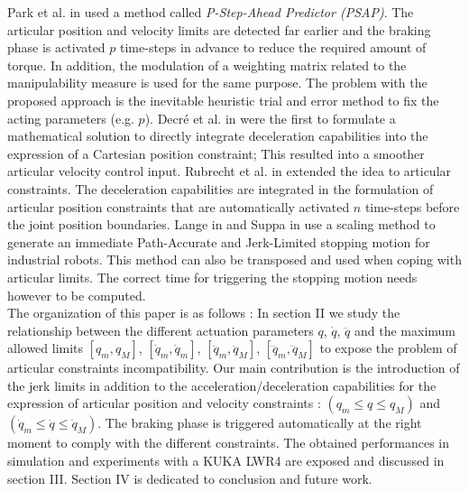 \documentclass[a4paper, 10pt, conference]{ieeeconf}      %
\begin{document}
Park et al. in \cite{park1998enhanced} used a method called \textit{P-Step-Ahead Predictor (PSAP)}. The articular position and velocity limits are  detected far earlier and the braking phase is activated $p$ time-steps in advance to reduce the required amount of torque. In addition, the modulation of a weighting matrix related to the manipulability measure \cite{yoshikawa1985manipulability} is used for the same purpose. The problem with the proposed approach is the inevitable heuristic trial and error method to fix the acting parameters (e.g. $p$). Decré et al. in \cite{decre2009extending} were the first to  formulate a mathematical solution to directly integrate deceleration capabilities into the expression of a Cartesian position constraint; This resulted into a smoother articular velocity control input. Rubrecht et al. in \cite{rubrecht2010constraints} extended the idea to articular constraints. The deceleration capabilities  are integrated in the formulation of articular position constraints that are automatically activated $n$ time-steps before the joint position boundaries. Lange in \cite{lange2014predictive} and Suppa in \cite{lange2015trajectory} use a scaling method to generate an immediate Path-Accurate and Jerk-Limited stopping motion for industrial robots. This method can also be transposed and used when coping with articular limits. The correct time for triggering the stopping motion needs however to be computed. 
\\

The organization of this paper is as follows : In section II we study the relationship between the different actuation parameters $q$, $\dot{q}$, $\ddot{q}$ and the maximum allowed limits $[q_m, q_M]$, $[\dot{q}_m, \dot{q}_m]$, $[\ddot{q}_m, \ddot{q}_M]$, $[\dddot{q}_m, \dddot{q}_M]$ to expose the problem of articular constraints incompatibility.
Our main contribution is the introduction of the jerk limits in addition to the acceleration/deceleration capabilities for the expression of articular position and velocity  constraints : $(q_{m} \leq q \leq q_{M})$ and $(\dot{q}_{m} \leq \dot{q} \leq \dot{q}_{M})$. The braking phase is triggered automatically at the right moment to comply with the different constraints.
The obtained performances in simulation and experiments with a KUKA LWR4 are exposed and discussed in section III. Section IV is dedicated to conclusion and future work.



\end{document}
